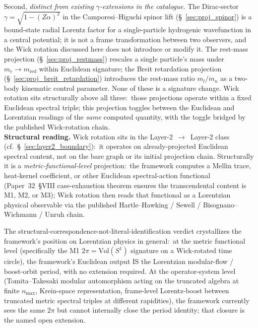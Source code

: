 Second, \emph{distinct from existing $\gamma$-extensions in the
catalogue.}  The Dirac-sector $\gamma = \sqrt{1 - (Z\alpha)^2}$ in
the Camporesi--Higuchi spinor lift (\S~\ref{sec:proj_spinor}) is a
bound-state radial Lorentz factor for a single-particle hydrogenic
wavefunction in a central potential; it is not a frame
transformation between two observers, and the Wick rotation
discussed here does not introduce or modify it.  The rest-mass
projection (\S~\ref{sec:proj_restmass}) rescales a single particle's
mass under $m_e \to m_\text{red}$ within Euclidean signature; the
Breit retardation projection
(\S~\ref{sec:proj_breit_retardation}) introduces the rest-mass
ratio $m_l/m_n$ as a two-body kinematic control parameter.  None of
these is a signature change.  Wick rotation sits structurally above
all three:\ those projections operate within a fixed Euclidean
spectral triple; this projection toggles between the Euclidean and
Lorentzian readings of the \emph{same} computed quantity, with the
toggle bridged by the published Wick-rotation chain.\\
\textbf{Structural reading.}  Wick rotation sits in the
Layer-2~$\to$~Layer-2 class (cf.\
\S~\ref{sec:layer2_boundary}):\ it operates on already-projected
Euclidean spectral content, not on the bare graph or its initial
projection chain.  Structurally it is a
\emph{metric-functional-level} projection:\ the framework computes a
Mellin trace, heat-kernel coefficient, or other Euclidean
spectral-action functional (Paper~32~§VIII case-exhaustion theorem
ensures the transcendental content is M1, M2, or M3); Wick rotation
then reads that functional as a Lorentzian physical observable via
the published Hartle--Hawking / Sewell / Bisognano--Wichmann / Unruh
chain.

The structural-correspondence-not-literal-identification verdict
crystallizes the framework's position on Lorentzian physics in
general:\ at the metric functional level (specifically the M1
$2\pi = \mathrm{Vol}(S^1)$ signature on a Wick-rotated time circle),
the framework's Euclidean output IS the Lorentzian modular-flow /
boost-orbit period, with no extension required.  At the
operator-system level (Tomita--Takesaki modular automorphism acting
on the truncated algebra at finite $n_{\max}$, Krein-space
representation, frame-level Lorentz-boost between truncated metric
spectral triples at different rapidities), the framework currently
sees the same $2\pi$ but cannot internally close the period
identity; that closure is the named open extension.


